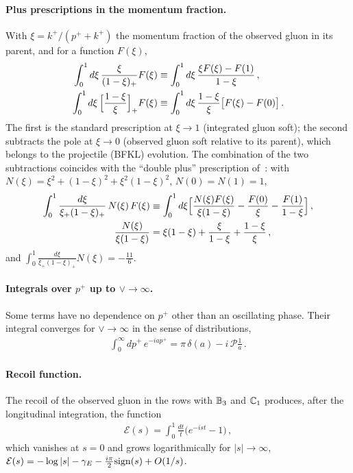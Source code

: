\paragraph{Plus prescriptions in the momentum fraction.} With $\xi=k^+/(p^++k^+)$ the momentum fraction of the observed gluon in its parent, and for a function $F(\xi)$,
\begin{align}\label{eq:plusxi}
\int_0^1d\xi\,\frac{\xi}{(1-\xi)_+}F(\xi)&\equiv\int_0^1d\xi\,\frac{\xi F(\xi)-F(1)}{1-\xi}\,,\notag\\
\int_0^1d\xi\,\Big[\frac{1-\xi}{\xi}\Big]_+F(\xi)&\equiv\int_0^1d\xi\,\frac{1-\xi}{\xi}\big[F(\xi)-F(0)\big]\,.
\end{align}
The first is the standard prescription at $\xi\to1$ (integrated gluon soft); the second subtracts the pole at $\xi\to0$ (observed gluon soft relative to its parent), which belongs to the projectile (BFKL) evolution. The combination of the two subtractions coincides with the ``double plus'' prescription of~\cite{Kovner:2023vsy}: with $N(\xi)=\xi^2+(1-\xi)^2+\xi^2(1-\xi)^2$, $N(0)=N(1)=1$,
\begin{align}
\int_0^1\frac{d\xi}{\xi_+(1-\xi)_+}\,N(\xi)\,F(\xi)&\equiv\int_0^1d\xi\Big[\frac{N(\xi)F(\xi)}{\xi(1-\xi)}-\frac{F(0)}{\xi}-\frac{F(1)}{1-\xi}\Big]\,,\notag\\
\frac{N(\xi)}{\xi(1-\xi)}&=\xi(1-\xi)+\frac{\xi}{1-\xi}+\frac{1-\xi}{\xi}\,,
\end{align}
and $\int_0^1\frac{d\xi}{\xi_+(1-\xi)_+}N(\xi)=-\frac{11}{6}$.

\paragraph{Integrals over $p^+$ up to $\vee\to\infty$.} Some terms have no dependence on $p^+$ other than an oscillating phase. Their integral converges for $\vee\to\infty$ in the sense of distributions,
\begin{align}\label{eq:distrib}
\int_0^\infty dp^+\,e^{-iap^+}=\pi\,\delta(a)-i\,\mathcal P\frac1a\,.
\end{align}

\paragraph{Recoil function.} The recoil of the observed gluon in the rows with $\mathbb{B}_3$ and $\mathbb{C}_1$ produces, after the longitudinal integration, the function
\begin{align}\label{eq:Erecoil}
\mathcal E(s)=\int_0^1\frac{dt}{t}\big(e^{-ist}-1\big)\,,
\end{align}
which vanishes at $s=0$ and grows logarithmically for $|s|\to\infty$, $\mathcal E(s)=-\log|s|-\gamma_E-\frac{i\pi}{2}{\rm sign}(s)+O(1/s)$.


